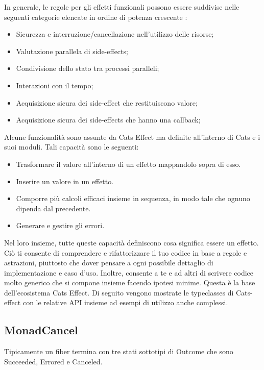\noindent In generale, le regole per gli effetti funzionali possono essere suddivise nelle seguenti categorie elencate in ordine di potenza crescente :

\begin{itemize}
    \item Sicurezza e interruzione/cancellazione nell'utilizzo delle risorse;
    \item Valutazione parallela di side-effects;
    \item Condivisione dello stato tra processi paralleli;
    \item Interazioni con il tempo;
    \item Acquisizione sicura dei side-effect che restituiscono valore;
    \item  Acquisizione sicura dei side-effects che hanno una callback;
\end{itemize}

\noindent Alcune funzionalità sono assunte da Cats Effect ma definite all'interno di Cats e i suoi moduli. Tali capacità sono le seguenti:
\begin{itemize}
    \item Trasformare il valore all’interno di un effetto mappandolo sopra di esso.
    \item Inserire un valore in un effetto.
    \item Comporre più calcoli efficaci insieme in sequenza, in modo tale che ognuno dipenda dal precedente.
    \item Generare e gestire gli errori.
\end{itemize}

\noindent Nel loro insieme, tutte queste capacità definiscono cosa significa essere un effetto. Ciò ti consente di comprendere e rifattorizzare il tuo codice in base a regole e astrazioni, piuttosto che dover pensare a ogni possibile dettaglio di implementazione e caso d'uso. Inoltre, consente a te e ad altri di scrivere codice molto generico che si compone insieme facendo ipotesi minime. Questa è la base dell'ecosistema Cats Effect. Di seguito vengono mostrate le typeclasses di Cats-effect con le relative API insieme ad esempi di utilizzo anche complessi.

\subsection{MonadCancel}
Tipicamente un fiber termina con tre stati sottotipi di Outcome che sono Succeeded, Errored e Canceled. 

